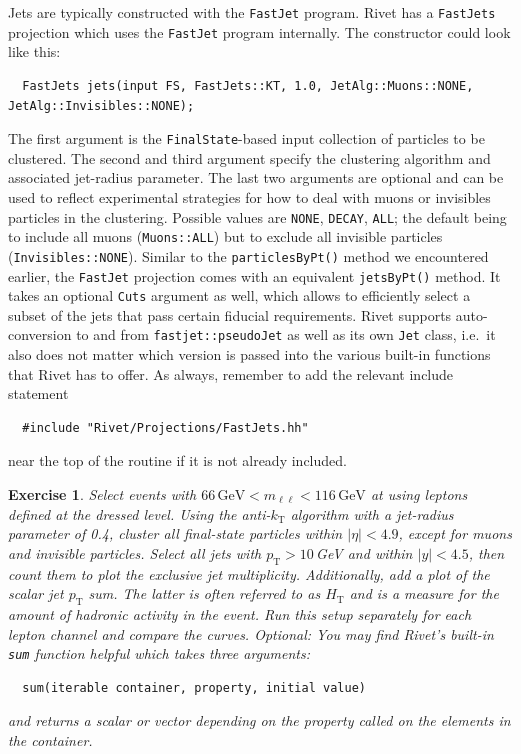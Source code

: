 \documentclass[10pt,fleqn]{scrartcl}
\theoremstyle{exstyle}
\newtheorem{exercise}{Exercise}
\begin{document}
Jets are typically constructed with the \texttt{FastJet} program.
Rivet has a \verb|FastJets| projection which uses the \texttt{FastJet} 
program internally. The constructor could look like this:
\begin{small}
\begin{verbatim}
  FastJets jets(input FS, FastJets::KT, 1.0, JetAlg::Muons::NONE, JetAlg::Invisibles::NONE);
\end{verbatim}
\end{small}
The first argument is the \verb|FinalState|-based input collection of particles to be clustered.
The second and third argument specify the clustering algorithm and associated jet-radius parameter.
The last two arguments are optional and can be used to reflect experimental strategies for
how to deal with muons or invisibles particles in the clustering.
Possible values are \verb|NONE|, \verb|DECAY|, \verb|ALL|; the default being 
to include all muons (\verb|Muons::ALL|) but to exclude all invisible particles (\verb|Invisibles::NONE|).
Similar to the \verb|particlesByPt()| method we encountered earlier, the \verb|FastJet| projection
comes with an equivalent \verb|jetsByPt()| method. It takes an optional \verb|Cuts| argument as well, 
which allows to efficiently select a subset of the jets that pass certain fiducial requirements.
Rivet supports auto-conversion to and from \verb|fastjet::pseudoJet| as well as its own \verb|Jet| class,
i.e.\ it also does not matter which version is passed into the various built-in functions that Rivet has to offer.
As always, remember to add the relevant include statement
\begin{verbatim}
  #include "Rivet/Projections/FastJets.hh"
\end{verbatim}
near the top of the routine if it is not already included.


\begin{exercise}
Select events with $66\,\text{GeV} < m_{\ell\ell} < 116\,\text{GeV}$ at using leptons
defined at the dressed level.
Using the anti-$k_\text{T}$ algorithm with a jet-radius parameter of 0.4,
cluster all final-state particles within $|\eta| < 4.9$, 
except for muons and invisible particles.
Select all jets with $p_\text{T} > 10$\,GeV and within $|y| < 4.5$,
then count them to plot the exclusive jet multiplicity.
Additionally, add a plot of the scalar jet $p_\text{T}$ sum.
The latter is often referred to as $H_\text{T}$ and is a measure
for the amount of hadronic activity in the event.
Run this setup separately for each lepton channel and compare the curves.
\emph{Optional:} You may find Rivet's built-in \verb|sum| function
helpful which takes three arguments:
\begin{verbatim}
  sum(iterable container, property, initial value)
\end{verbatim}
and returns a scalar or vector depending on the property called
on the elements in the container.
\end{exercise}
\end{document}
